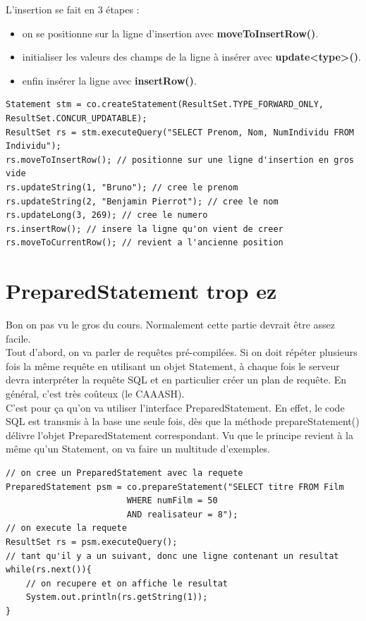 \documentclass{report}
\begin{document}
L'insertion se fait en 3 étapes :
\begin{itemize}
\item on se positionne sur la ligne d'insertion avec \textbf{moveToInsertRow()}.
\item initialiser les valeurs des champs de la ligne à insérer avec \textbf{update<type>()}.
\item enfin insérer la ligne avec \textbf{insertRow()}.
\end{itemize}
\newpage
\begin{lstlisting}[style=MyJavaStyle]
Statement stm = co.createStatement(ResultSet.TYPE_FORWARD_ONLY, ResultSet.CONCUR_UPDATABLE);
ResultSet rs = stm.executeQuery("SELECT Prenom, Nom, NumIndividu FROM Individu");
rs.moveToInsertRow(); // positionne sur une ligne d'insertion en gros vide
rs.updateString(1, "Bruno"); // cree le prenom
rs.updateString(2, "Benjamin Pierrot"); // cree le nom
rs.updateLong(3, 269); // cree le numero
rs.insertRow(); // insere la ligne qu'on vient de creer
rs.moveToCurrentRow(); // revient a l'ancienne position
\end{lstlisting}

\section{PreparedStatement trop ez}
Bon on pas vu le gros du cours. Normalement cette partie devrait être assez facile.\\
Tout d'abord, on va parler de requêtes pré-compilées. Si on doit répéter plusieurs fois la même requête en utilisant un objet Statement, à chaque fois le serveur devra interpréter la requête SQL et en particulier créer un plan de requête. En général, c'est très coûteux (le CAAASH).\\
C'est pour ça qu'on va utiliser l'interface PreparedStatement. En effet, le code SQL est transmis à la base une seule fois, dès que la méthode prepareStatement() délivre l'objet PreparedStatement correspondant. Vu que le principe revient à la même qu'un Statement, on va faire un multitude d'exemples.
\begin{lstlisting}[style=MyJavaStyle]
// on cree un PreparedStatement avec la requete
PreparedStatement psm = co.prepareStatement("SELECT titre FROM Film 
					    WHERE numFilm = 50
					    AND realisateur = 8");
// on execute la requete
ResultSet rs = psm.executeQuery();
// tant qu'il y a un suivant, donc une ligne contenant un resultat
while(rs.next()){
	// on recupere et on affiche le resultat
	System.out.println(rs.getString(1)); 
}
\end{lstlisting}
\end{document}
